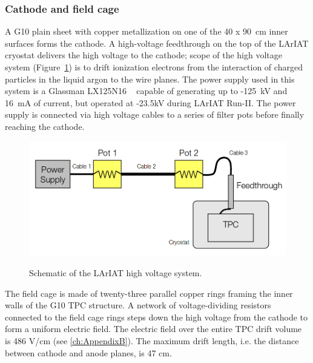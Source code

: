 \subsubsection{Cathode and field cage}
A G10 plain sheet with copper metallization on one of the 40 x 90~cm inner surfaces forms the cathode. 
A high-voltage feedthrough on the top of the LArIAT cryostat delivers the high voltage to the cathode; scope of the high voltage system (Figure~\ref{fig:HVScheme}) is to drift ionization electrons from the interaction of charged particles in the liquid argon to the wire planes.  The power supply used in this system is a Glassman LX125N16 ~\cite{GlassmanPS} capable of generating up to -125~kV and 16~mA of current, but operated at -23.5kV during LArIAT Run-II. The power supply is connected via high voltage cables to a series of filter pots before finally reaching the cathode. 

\begin{figure}[htb]
\centering
\includegraphics[scale=0.35]{Chapter-3/Images//HVSchematic.png}\\
\caption{Schematic of the LArIAT high voltage system.}
\label{fig:HVScheme}
\end{figure}%



The field cage is made of twenty-three parallel copper rings framing the inner walls of the G10 TPC structure. A network of voltage-dividing resistors connected to the field cage rings steps down the high voltage from the cathode to form a uniform electric field. The electric field over the entire TPC drift volume is  486 V/cm (see \ref{ch:AppendixB}). The  maximum drift length, i.e. the distance between cathode and anode planes, is 47 cm.

